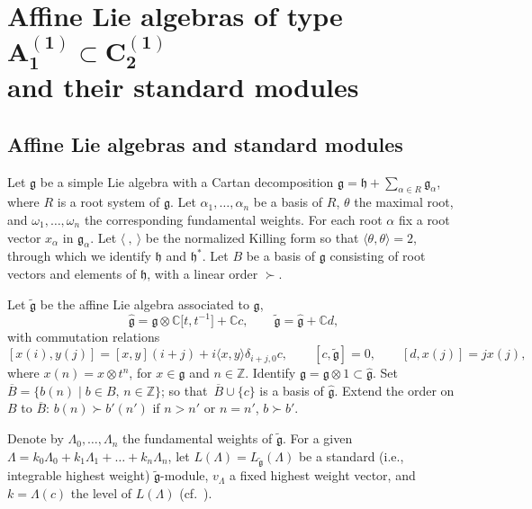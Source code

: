 \documentclass[pdftex]{sigma}
\newcommand{\g}
{{\mathfrak g}}
\newcommand{\gk}
{\hat{{\mathfrak g}}}
\newcommand{\gt}
{\tilde{{\mathfrak g}}}
\newcommand{\h}
{{\mathfrak h}}
\numberwithin{equation}{section}
\begin{document}
\section[Affine Lie algebras of type A\_1\^(1) C\_2\^(1) and their standard modules]{Affine Lie algebras of type $\boldsymbol{ A_1^{(1)} \subset C_2^{(1)}}$\\ and their standard modules}

\subsection{Affine Lie algebras and standard modules}

Let $\g$ be a simple Lie algebra with a Cartan decomposition $\mathfrak g={\mathfrak h}+\sum_{\alpha\in R} \mathfrak g_\alpha$, where
$R$
 is a root system of $\g$. Let $\alpha_1,\dots, \alpha_n$ be a basis of $R$, $\theta$ the maximal root, and $\omega_1, \dots,\omega_n$ the corresponding fundamental weights. For each root $\alpha$ fix a root vector $x_\alpha$ in $\g_\alpha$.
Let $\langle\ ,\ \rangle$ be the normalized Killing form so that $\langle\theta,\theta\rangle=2$, through which we identify $\h$ and $\h^*$.
Let $B$ be a basis of ${\mathfrak g}$ consisting of root vectors and elements of $\h$, with a linear order $\succ$.


Let $\tilde{\mathfrak g}$ be the affine Lie algebra associated to $\g$,
\[
\hat{\mathfrak g} = \mathfrak{g} \otimes
\mathbb{C}\bigl[t,t^{-1}\bigr] + \mathbb{C}c, \qquad
\tilde{\mathfrak g} = \hat{\mathfrak g} + \mathbb{C} d,
\]
with commutation relations
\[
[x(i),y(j)]= [x,y](i+j)+ i\langle x,y\rangle
\delta_{i+j,0}c,\qquad [c,\gt] = 0, \qquad [d,x(j)] = j x(j),\]
where $x(n)=x\otimes t^{n}$, for $x\in{\mathfrak g}$ and $n\in\mathbb Z$. Identify $\g=\g\otimes 1\subset \gk$.
Set $\overline{B}=\{b(n) \mid b\in B,\, n \in\mathbb{Z}\}$; so that~${\overline{B}\cup \{c\}}$ is a basis of $\gk$. Extend the order on $B$ to $\overline{B}$:
$b(n)\succ b'(n')$ if $n>n'$ or $n=n'$, $ b\succ b'$.

Denote by $\Lambda_0,\dots,\Lambda_n$ the fundamental weights of $\gt$. For a given
$\Lambda=k_0 \Lambda_0+k_1 \Lambda_1+\dots+k_n \Lambda_n$, let $L(\Lambda)=L_{\gt}(\Lambda)$ be a standard (i.e., integrable highest weight) $\tilde{\mathfrak g}$-module, $v_\Lambda$ a fixed highest weight vector, and $k=\Lambda(c)$ the level of $L(\Lambda)$ (cf.\ \cite{K}).



\end{document}
